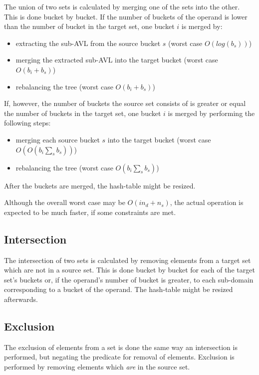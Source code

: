         The union of two sets is calculated by merging one of the sets into the
        other.
        This is done bucket by bucket.
        If the number of buckets of the operand is lower than the number of
        bucket in the target set, one bucket $i$ is merged by:
        \begin{itemize}
            \item extracting the sub-AVL from the source bucket $s$ (worst case
                $O(log(b_s))$)
            \item merging the extracted sub-AVL into the target bucket
                (worst case $O(b_i+b_s)$)
            \item rebalancing the tree (worst case $O(b_i+b_s)$)
        \end{itemize}

        If, however, the number of buckets the source set consists of is greater
        or equal the number of buckets in the target set, one bucket $i$ is
        merged by performing the following steps:
        \begin{itemize}
             \item merging each source bucket $s$ into the target bucket (worst
                case $O(O(b_i \sum_s b_s))$)
            \item rebalancing the tree (worst case $O(b_i \sum_s b_s)$)
        \end{itemize}

        After the buckets are merged, the hash-table might be resized.

        Although the overall worst case may be $O(in_d+n_s)$, the actual
        operation is expected to be much faster, if some constraints are met.


    \subsection{Intersection}

        The intersection of two sets is calculated by removing elements from a
        target set which are not in a source set.
        This is done bucket by bucket for each of the target set's buckets or,
        if the operand's number of bucket is greater, to each sub-domain
        corresponding to a bucket of the operand.
        The hash-table might be resized afterwards.


    \subsection{Exclusion}

        The exclusion of elements from a set is done the same way an
        intersection is performed, but negating the predicate for removal of
        elements.
        Exclusion is performed by removing elements which \emph{are} in the
        source set.



